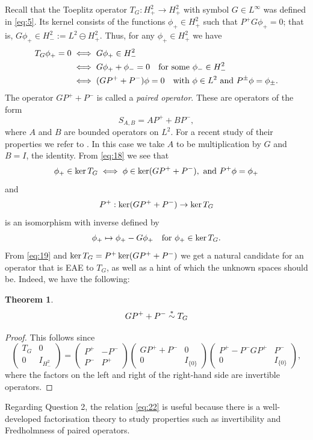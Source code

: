 \documentclass[11pt]{article}
\newtheorem{thm}{Theorem}[section]
\def\beq{\begin{equation}}
\def\eeq{\end{equation}}
\def\ker{\mathop{\rm ker}\nolimits}
\newcommand{\simast}{%
    \ensuremath{%
       \stackrel{\mathsf{\ast}}{\sim}}}
\begin{document}
Recall that the Toeplitz operator $T_G: H^2_+ \to H^2_+$ with symbol $G \in L^\infty$
was defined  in \eqref{eq:5}.
Its kernel consists of the functions $\phi_+ \in H^2_+$ such that 
$P^+ G \phi_+=0$; that is, $G\phi_+ \in H^2_-:= L^2 \ominus H^2_+$. Thus,
for any $\phi_+ \in H^2_+$ we have
\begin{align}\label{eq:18}
T_G \phi_+ = 0 & \iff G\phi_+\in H^2_-\nonumber
\\
& \iff G\phi_+ + \phi_- = 0 \quad \hbox{for some } \phi_- \in H^2_- \nonumber \\
& \iff (GP^+ + P^-)\phi=0 \quad \hbox{with } \phi \in L^2 \hbox{ and } P^\pm\phi=\phi_\pm.
\end{align}
The operator $GP^+ + P^-$ is called a {\em paired operator}. These are operators
of the form 
\[
S_{A,B} = AP^+ + B P^-,
\]
where $A$ and $B$ are bounded operators on $L^2$. 
For a recent study of their properties we refer to \cite{CGP24,CP24}.
In this case
we take $A$ to be multiplication by $G$ and $B=I$, the identity. From
\eqref{eq:18} we see that
\beq\label{eq:19}
\phi_+ \in \ker T_G \iff \phi \in \ker (GP^++P^-), \hbox{ and } P^+\phi=\phi_+ 
\eeq
and
\[
P^+: \ker (GP^++P^-) \to \ker T_G
\]
is an isomorphism with inverse defined by
\[
\phi_+ \mapsto \phi_+ - G \phi_+ \quad \hbox{for } \phi_+ \in \ker T_G.
\]
From \eqref{eq:19} and $\ker T_G=P^+ \ker (GP^++P^-)$ we get a natural candidate for
an operator that is EAE to $T_G$, as well as a 
hint of which the unknown spaces should be. Indeed, we have the following:
\begin{thm}\label{thm:2.1aug3}
\beq\label{eq:22}
GP^++P^- \simast T_G
\eeq
\end{thm}
\begin{proof}
This follows since
\[
\begin{pmatrix}
T_G & 0 \\ 0 & I_{H^2_-}
\end{pmatrix}
=
\begin{pmatrix}
P^+ & -P^- \\ P^- & P^+ 
\end{pmatrix}
\begin{pmatrix}
GP^++P^- & 0 \\ 0 & I_{\{0\}}
\end{pmatrix}
\begin{pmatrix}
P^+ -P^-GP^+ & P^- \\ 0 & I_{\{0\}}
\end{pmatrix},
\]
where the factors on the left and right of the right-hand side are invertible operators.
\end{proof}
Regarding Question 2, the relation \eqref{eq:22} is useful because there is a well-developed
factorisation theory to study properties such as invertibility and Fredholmness of paired operators.
\end{document}

